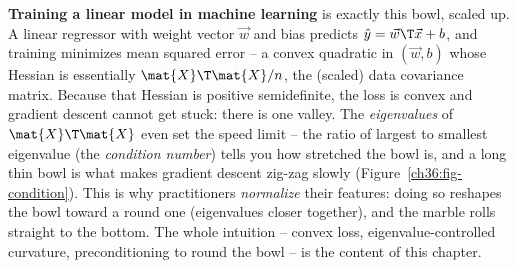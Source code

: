 \begin{applicationbox}
\textbf{Training a linear model in machine learning} is exactly this bowl, scaled up.
A linear regressor with weight vector $\vec{w}$ and bias predicts $\hat y = \vec{w}\T
\vec{x}+b$, and training minimizes mean squared error -- a convex quadratic in
$(\vec{w},b)$ whose Hessian is essentially $\mat{X}\T\mat{X}/n$, the (scaled) data
covariance matrix. Because that Hessian is positive semidefinite, the loss is convex
and gradient descent cannot get stuck: there is one valley. The \emph{eigenvalues} of
$\mat{X}\T\mat{X}$ even set the speed limit -- the ratio of largest to smallest
eigenvalue (the \emph{condition number}) tells you how stretched the bowl is, and a
long thin bowl is what makes gradient descent zig-zag slowly
(Figure~\ref{ch36:fig-condition}). This is why
practitioners \emph{normalize} their features: doing so reshapes the bowl toward a
round one (eigenvalues closer together), and the marble rolls straight to the
bottom. The whole intuition -- convex loss, eigenvalue-controlled curvature,
preconditioning to round the bowl -- is the content of this chapter.
\end{applicationbox}

